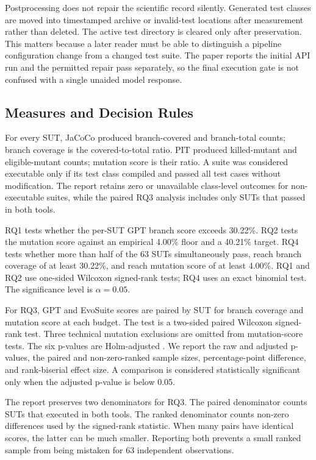 ﻿\documentclass[conference]{IEEEtran}
\begin{document}
Postprocessing does not repair the scientific record silently. Generated test classes are moved into timestamped archive or invalid-test locations after measurement rather than deleted. The active test directory is cleared only after preservation. This matters because a later reader must be able to distinguish a pipeline configuration change from a changed test suite. The paper reports the initial API run and the permitted repair pass separately, so the final execution gate is not confused with a single unaided model response.

\subsection{Measures and Decision Rules}
For every SUT, JaCoCo \cite{jacoco} produced branch-covered and branch-total counts; branch coverage is the covered-to-total ratio. PIT \cite{coles2016pit} produced killed-mutant and eligible-mutant counts; mutation score is their ratio. A suite was considered executable only if its test class compiled and passed all test cases without modification. The report retains zero or unavailable class-level outcomes for non-executable suites, while the paired RQ3 analysis includes only SUTs that passed in both tools.

RQ1 tests whether the per-SUT GPT branch score exceeds 30.22\%. RQ2 tests the mutation score against an empirical 4.00\% floor and a 40.21\% target. RQ4 tests whether more than half of the 63 SUTs simultaneously pass, reach branch coverage of at least 30.22\%, and reach mutation score of at least 4.00\%. RQ1 and RQ2 use one-sided Wilcoxon signed-rank tests; RQ4 uses an exact binomial test. The significance level is $\alpha=0.05$.

For RQ3, GPT and EvoSuite scores are paired by SUT for branch coverage and mutation score at each budget. The test is a two-sided paired Wilcoxon signed-rank test. Three technical mutation exclusions are omitted from mutation-score tests. The six p-values are Holm-adjusted \cite{holm1979}. We report the raw and adjusted p-values, the paired and non-zero-ranked sample sizes, percentage-point difference, and rank-biserial effect size. A comparison is considered statistically significant only when the adjusted p-value is below 0.05.

The report preserves two denominators for RQ3. The paired denominator counts SUTs that executed in both tools. The ranked denominator counts non-zero differences used by the signed-rank statistic. When many pairs have identical scores, the latter can be much smaller. Reporting both prevents a small ranked sample from being mistaken for 63 independent observations.
\end{document}
